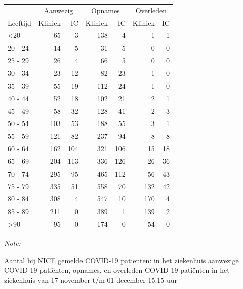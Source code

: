 \documentclass[
  english,
  man,floatsintext]{apa6}
\begin{document}
\begin{table}
\centering\begingroup\fontsize{10}{12}\selectfont

\begin{threeparttable}
\begin{tabular}{lrrrrrr}
\toprule
\multicolumn{1}{c}{ } & \multicolumn{2}{c}{Aanwezig} & \multicolumn{2}{c}{Opnames} & \multicolumn{2}{c}{Overleden} \\
\cmidrule(l{3pt}r{3pt}){2-3} \cmidrule(l{3pt}r{3pt}){4-5} \cmidrule(l{3pt}r{3pt}){6-7}
Leeftijd & Kliniek & IC & Kliniek & IC & Kliniek & IC\\
\midrule
<20 & 65 & 3 & 138 & 4 & 1 & -1\\
20 - 24 & 14 & 5 & 31 & 5 & 0 & 0\\
25 - 29 & 26 & 4 & 66 & 5 & 0 & 0\\
30 - 34 & 23 & 12 & 82 & 23 & 1 & 0\\
35 - 39 & 55 & 19 & 112 & 24 & 1 & 0\\
40 - 44 & 52 & 18 & 102 & 21 & 2 & 1\\
45 - 49 & 58 & 32 & 128 & 41 & 2 & 3\\
50 - 54 & 103 & 53 & 188 & 55 & 3 & 1\\
55 - 59 & 121 & 82 & 237 & 94 & 8 & 8\\
60 - 64 & 162 & 104 & 321 & 106 & 15 & 18\\
65 - 69 & 204 & 113 & 336 & 126 & 26 & 36\\
70 - 74 & 295 & 95 & 465 & 112 & 56 & 43\\
75 - 79 & 335 & 51 & 558 & 70 & 132 & 42\\
80 - 84 & 308 & 4 & 547 & 10 & 170 & 4\\
85 - 89 & 211 & 0 & 389 & 1 & 139 & 2\\
>90 & 95 & 0 & 174 & 0 & 54 & 0\\
\bottomrule
\end{tabular}
\begin{tablenotes}
\item \textit{Note: } 
\item Aantal bij NICE gemelde COVID-19 patiënten: in het ziekenhuis aanwezige COVID-19 patiënten, opnames, en overleden COVID-19 patiënten in het ziekenhuis van 17 november t/m 01 december 15:15 uur
\end{tablenotes}
\end{threeparttable}
\endgroup{}
\end{table}

\newpage
\end{document}
